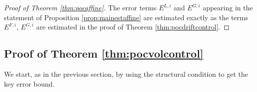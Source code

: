 \documentclass[11pt,reqno]{amsart}
\numberwithin{equation}{section}
\theoremstyle{definition}
\begin{document}
\begin{proof}[Proof of Theorem \ref{thm:pocaffine}]
The error terms $E^{L,i}$ and $E^{G,i}$ appearing in the statement of Proposition \ref{prop:mainestaffine} are estimated exactly as the terms $E^{F,i}$, $E^{G,i}$ are estimated in the proof of Theorem \ref{thm:pocdriftcontrol}.
\end{proof}






\subsection{Proof of Theorem \ref{thm:pocvolcontrol}}
\label{subsec:proofmain}

We start, as in the previous section, by using the structural condition to get the key error bound.
\end{document}
